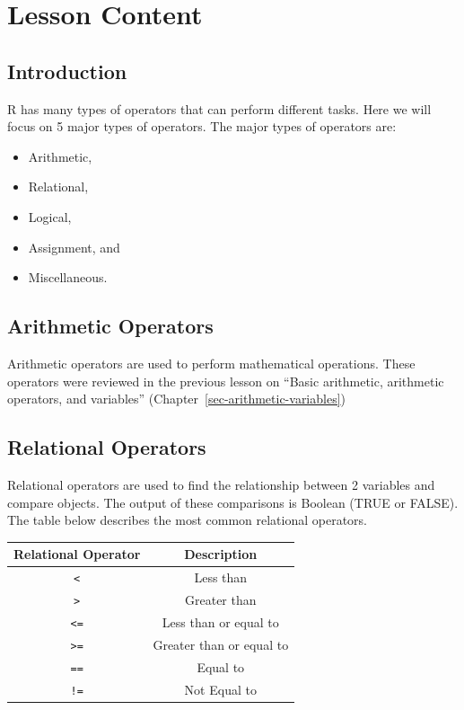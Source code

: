 \documentclass[
  letterpaper,
  DIV=11,
  numbers=noendperiod]{scrreprt}
\providecommand{\tightlist}{%
  \setlength{\itemsep}{0pt}\setlength{\parskip}{0pt}}\usepackage{longtable,booktabs,array}
\begin{document}
\section{Lesson Content}\label{lesson-content-6}

\subsection{Introduction}\label{introduction-4}

R has many types of operators that can perform different tasks. Here we
will focus on 5 major types of operators. The major types of operators
are:

\begin{itemize}
\tightlist
\item
  Arithmetic,
\item
  Relational,
\item
  Logical,
\item
  Assignment, and
\item
  Miscellaneous.
\end{itemize}

\subsection{Arithmetic Operators}\label{arithmetic-operators-1}

Arithmetic operators are used to perform mathematical operations. These
operators were reviewed in the previous lesson on ``Basic arithmetic,
arithmetic operators, and variables''
(Chapter~\ref{sec-arithmetic-variables})

\subsection{Relational Operators}\label{relational-operators}

Relational operators are used to find the relationship between 2
variables and compare objects. The output of these comparisons is
Boolean (TRUE or FALSE). The table below describes the most common
relational operators.

\begin{longtable}[]{@{}cc@{}}
\toprule\noalign{}
Relational Operator & Description \\
\midrule\noalign{}
\endhead
\bottomrule\noalign{}
\endlastfoot
\texttt{\textless{}} & Less than \\
\texttt{\textgreater{}} & Greater than \\
\texttt{\textless{}=} & Less than or equal to \\
\texttt{\textgreater{}=} & Greater than or equal to \\
\texttt{==} & Equal to \\
\texttt{!=} & Not Equal to \\
\end{longtable}
\end{document}
